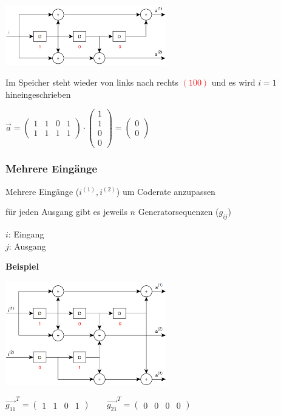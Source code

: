 \includegraphics[width=7cm]{img/faltungscoder1in2out.PNG}

Im Speicher steht wieder von links nach rechts \textcolor{red}{$ (1 0 0) $} und es wird $i = 1$ hineingeschrieben

$\displaystyle{
    \vec{a} =
    \begin{pmatrix}
        1 & 1 & 0 & 1\\
        1 & 1 & 1 & 1
    \end{pmatrix}
    \cdot
    \begin{pmatrix}
        1\\
        1\\
        0\\
        0
    \end{pmatrix} =
    \begin{pmatrix}
        0\\
        0
    \end{pmatrix}
}$

\subsubsection{Mehrere Eingänge}

Mehrere Eingänge ($i^{(1)}, i^{(2)}$) um Coderate anzupassen

für jeden Ausgang gibt es jeweils $n$ Generatorsequenzen ($g_{ij}$)

$i$: Eingang\\
$j$: Ausgang

\textbf{Beispiel}

\includegraphics[width=7cm]{img/faltungscoder2in3out.PNG}

$\displaystyle{
    \vec{g_{11}}^T = \begin{pmatrix}
        1 & 1 & 0 & 1
    \end{pmatrix}
    \;\;\;\;\;\;\;
    \vec{g_{21}}^T = \begin{pmatrix}
        0 & 0 & 0 & 0
    \end{pmatrix}
}$

